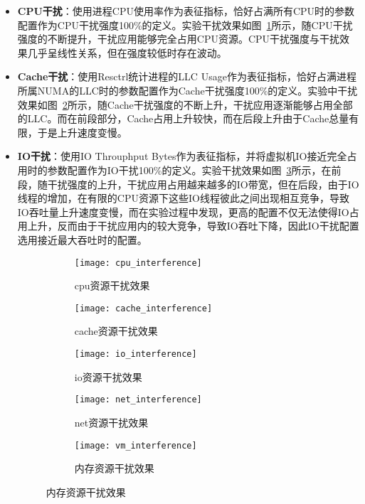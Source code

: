\begin{itemize}
    
    \item \textbf{CPU干扰}：使用进程CPU使用率作为表征指标，恰好占满所有CPU时的参数配置作为CPU干扰强度100\%的定义。实验干扰效果如图~\ref{fig:cpu_interference}所示，随CPU干扰强度的不断提升，干扰应用能够完全占用CPU资源。CPU干扰强度与干扰效果几乎呈线性关系，但在强度较低时存在波动。
    
    \item \textbf{Cache干扰}：使用Resctrl统计进程的LLC Usage作为表征指标，恰好占满进程所属NUMA的LLC时的参数配置作为Cache干扰强度100\%的定义。实验中干扰效果如图~\ref{fig:cache_interference}所示，随Cache干扰强度的不断上升，干扰应用逐渐能够占用全部的LLC。而在前段部分，Cache占用上升较快，而在后段上升由于Cache总量有限，于是上升速度变慢。

    \item \textbf{IO干扰}：使用IO Throuphput Bytes作为表征指标，并将虚拟机IO接近完全占用时的参数配置作为IO干扰100\%的定义。实验干扰效果如图~\ref{fig:io_interference}所示，在前段，随干扰强度的上升，干扰应用占用越来越多的IO带宽，但在后段，由于IO线程的增加，在有限的CPU资源下这些IO线程彼此之间出现相互竞争，导致IO吞吐量上升速度变慢，而在实验过程中发现，更高的配置不仅无法使得IO占用上升，反而由于干扰应用内的较大竞争，导致IO吞吐下降，因此IO干扰配置选用接近最大吞吐时的配置。

\begin{figure}[H]
  \centering
  \begin{subfigure}[b]{0.3\textwidth}
    \texttt{[image: cpu\_interference]}
    \caption{cpu资源干扰效果}
    \label{fig:cpu_interference}
  \end{subfigure}
  \begin{subfigure}[b]{0.3\textwidth}
    \texttt{[image: cache\_interference]}
    \caption{cache资源干扰效果}
    \label{fig:cache_interference}
  \end{subfigure}
  \begin{subfigure}[b]{0.3\textwidth}
    \texttt{[image: io\_interference]}
    \caption{io资源干扰效果}
    \label{fig:io_interference}
  \end{subfigure}
  \begin{subfigure}[b]{0.3\textwidth}
    \texttt{[image: net\_interference]}
    \caption{net资源干扰效果}
    \label{fig:net_interference}
  \end{subfigure}
  \begin{subfigure}[b]{0.3\textwidth}
    \texttt{[image: vm\_interference]}
    \caption{内存资源干扰效果}
    \label{fig:vm_interference}
  \end{subfigure}
  \label{fig:interference}
\end{figure}


\end{itemize}
